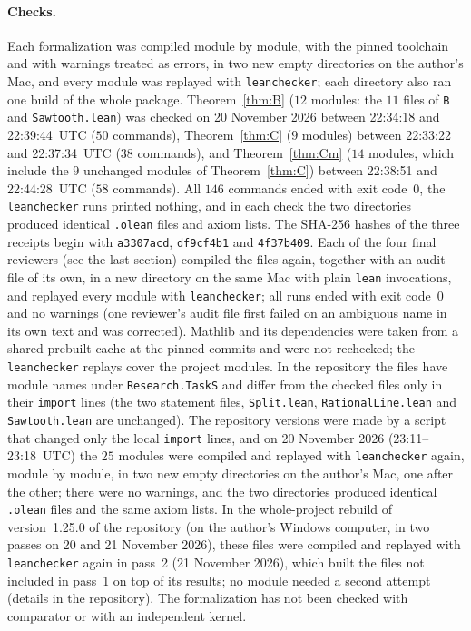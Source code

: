 \documentclass[11pt]{article}
\theoremstyle{definition}
\theoremstyle{remark}
\newcommand{\repoversion}{1.25.0}
\begin{document}
{\paragraph{Checks.}
Each formalization was compiled module by module, with the pinned toolchain
and with warnings treated as errors, in two new empty directories on the
author's Mac, and every module was replayed with \texttt{leanchecker}; each
directory also ran one build of the whole package. Theorem~\ref{thm:B}
($12$ modules: the $11$ files of \texttt{B} and \texttt{Sawtooth.lean}) was
checked on 20 November 2026 between 22:34:18 and 22:39:44~UTC ($50$
commands), Theorem~\ref{thm:C} ($9$ modules) between 22:33:22 and
22:37:34~UTC ($38$ commands), and Theorem~\ref{thm:Cm} ($14$ modules, which
include the $9$ unchanged modules of Theorem~\ref{thm:C}) between 22:38:51
and 22:44:28~UTC ($58$ commands). All $146$ commands ended with exit
code~$0$, the \texttt{leanchecker} runs printed nothing, and in each check
the two directories produced identical \texttt{.olean} files and axiom lists.
The SHA-256 hashes of the three receipts begin with \texttt{a3307acd},
\texttt{df9cf4b1} and \texttt{4f37b409}. Each of the four final reviewers
(see the last section) compiled the files again, together with an audit file
of its own, in a new directory on the same Mac with plain \texttt{lean}
invocations, and replayed every module with \texttt{leanchecker}; all runs
ended with exit code~$0$ and no warnings (one reviewer's audit file first
failed on an ambiguous name in its own text and was corrected). Mathlib and its
dependencies were taken from a shared prebuilt cache at the pinned commits and
were not rechecked; the \texttt{leanchecker} replays cover the project
modules. In the repository the files have module names under
\texttt{Research.TaskS} and differ from the checked files only in their
\texttt{import} lines (the two statement files, \texttt{Split.lean},
\texttt{RationalLine.lean} and \texttt{Sawtooth.lean} are unchanged).
The repository versions were made by a script that changed only the local \texttt{import} lines, and on 20 November 2026 (23:11--23:18~UTC) the $25$ modules were compiled and replayed with \texttt{leanchecker} again, module by module, in two new empty directories on the author's Mac, one after the other; there were no warnings, and the two directories produced identical \texttt{.olean} files and the same axiom lists. In the whole-project rebuild of version~\repoversion{} of the repository (on the author's Windows computer, in two passes on 20 and 21 November 2026), these files were compiled and replayed with \texttt{leanchecker} again in pass~2 (21 November 2026), which built the files not included in pass~1 on top of its results; no module needed a second attempt (details in the repository). The formalization has not been checked with
comparator or with an independent kernel.

\par}
\end{document}
